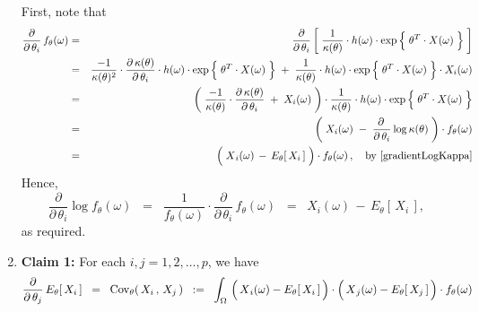 \begin{enumerate}
	First, note that
	\begin{eqnarray*}
	\dfrac{\partial}{\partial\,\theta_{i}}\,f_{\theta}(\omega)
	& = &
		\dfrac{\partial}{\partial\,\theta_{i}}
		\left[\;
			\dfrac{1}{\kappa(\theta)}
			\cdot
			h(\omega)
			\cdot
			\exp\left\{\; \theta^{T} \!\overset{{\color{white}-}}{\cdot}\! X(\omega) \;\right\}
		\;\right]
	\\
	&=&
		\dfrac{-1}{\kappa(\theta)^{2}}
		\cdot
		\dfrac{\partial\,\kappa(\theta)}{\partial\,\theta_{i}}
		\cdot
		h(\omega)
		\cdot
		\exp\left\{\; \theta^{T} \!\overset{{\color{white}-}}{\cdot}\! X(\omega) \;\right\}
		\; + \;
		\dfrac{1}{\kappa(\theta)}
		\cdot
		h(\omega)
		\cdot
		\exp\left\{\; \theta^{T} \!\overset{{\color{white}-}}{\cdot}\! X(\omega) \;\right\}
		\cdot
		X_{i}(\omega)
	\\
	&=&
		\left(\;
			\dfrac{-1}{\kappa(\theta)}
			\cdot
			\dfrac{\partial\,\kappa(\theta)}{\partial\,\theta_{i}}
			\; + \;
			X_{i}(\omega)
		\;\right)
		\cdot
		\dfrac{1}{\kappa(\theta)}
		\cdot
		h(\omega)
		\cdot
		\exp\left\{\; \theta^{T} \!\overset{{\color{white}-}}{\cdot}\! X(\omega) \;\right\}
	\\
	&=&
		\left(\;
			X_{i}(\omega)
			\; - \;
			\dfrac{\partial\,}{\partial\,\theta_{i}} \log \kappa(\theta)
		\;\right)
		\cdot
		f_{\theta}(\omega)
	\\
	&=&
		\left(\;
			\overset{{\color{white}.}}{X}_{i}(\omega) \, - \, E_{\theta}\!\left[\,X_{i}\,\right]
		\;\right)
		\cdot
		f_{\theta}(\omega)\,,
		\quad
		\textnormal{by \eqref{gradientLogKappa}}
	\end{eqnarray*}
	Hence,
	\begin{equation*}
	\dfrac{\partial}{\partial\,\theta_{i}} \log f_{\theta}(\omega)
	\;\; = \;\;
		\dfrac{1}{f_{\theta}(\omega)}
		\cdot
		\dfrac{\partial}{\partial\,\theta_{i}}\,f_{\theta}(\omega)
	\;\; = \;\;
		X_{i}(\omega) \, - \, E_{\theta}\!\left[\,X_{i}\,\right],
	\end{equation*}
	as required.
\item
	\textbf{Claim 1:}\quad
	For each $i,j = 1, 2, \ldots, p$, we have
	\begin{equation*}
	\dfrac{\partial}{\partial\,\theta_{j}}\,E_{\theta}\!\left[\,X_{i}\,\right]
	\;\; = \;\;
		\Cov_{\theta}\!\left(\,X_{i}\,,\,X_{j}\,\right)
	\;\; := \;\;
		\int_{\Omega}\,
			\left(\,\overset{{\color{white}.}}{X}_{i}(\omega) - E_{\theta}\!\left[\,X_{i}\,\right]\,\right)
			\cdot
			\left(\,\overset{{\color{white}.}}{X}_{j}(\omega) - E_{\theta}\!\left[\,X_{j}\,\right]\,\right)
			\cdot
			f_{\theta}(\omega)

\end{equation*}
\end{enumerate}
